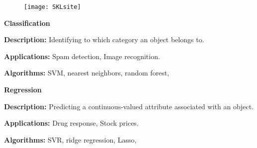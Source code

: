 \documentclass[MASTER.tex]{subfiles}
\begin{document}
 
 
% 
%  
%  
% 
% 
% 
%
%
% 
% 
%
% 
%
% 
 
 \begin{figure}
\centering
\texttt{[image: SKLsite]}

\end{figure}

 
 
  
\textbf{Classification}
 
\item \textbf{Description:} Identifying to which category an object belongs to.
\item \textbf{Applications:} Spam detection, Image recognition.
\item \textbf{Algorithms:} SVM, nearest neighbors, random forest, 
 

 
 
 
\textbf{Regression}
 
\item \textbf{Description:} Predicting a continuous-valued attribute associated with an object.
\item \textbf{Applications:} Drug response, Stock prices.
\item \textbf{Algorithms:} SVR, ridge regression, Lasso, 
\end{document}
